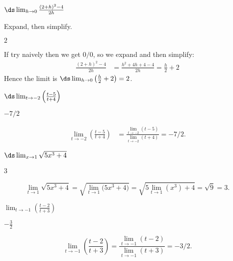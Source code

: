 \begin{Mquestion}[2015Q]
$\ds \lim_{h \to 0} \frac{(2+h)^2-4}{2h}$
\end{Mquestion}
\begin{hint}
Expand, then simplify.
\end{hint}
\begin{answer}
$2$
\end{answer}
\begin{solution}
If try naively then we get $0/0$, so we expand and then simplify:
\begin{align*}
  \frac{(2+h)^2-4}{2h} &= \frac{h^2+4h+4-4}{2h} = \frac{h}{2}+2
\end{align*}
Hence the limit is $\ds \lim_{h \to 0} \left(\frac{h}{2}+2\right) = 2$.
\end{solution}


\begin{question}[2015Q]
 $\ds \lim_{t\to -2} \left(\frac{t-5}{t+4}\right)$
\end{question}
\begin{answer}
$-7/2$
\end{answer}
\begin{solution}
 \begin{align*}
  \lim_{t\to -2} \left(\frac{t-5}{t+4}\right)
  &= \frac{\lim_{t\to -2} (t-5)}{\lim_{t\to-2}(t+4)}
  = -7/2.
\end{align*}
\end{solution}


\begin{question}[2015Q]
  $\ds \lim_{x\to 1} \sqrt{5x^3 + 4}$
\end{question}
\begin{answer}
3
\end{answer}
\begin{solution}
    \[
        \lim_{t\to 1} \sqrt{5x^3 + 4} =
        \sqrt{\lim_{t\to 1}\bigl(5x^3 + 4\bigr)} =
        \sqrt{5\lim_{t\to 1}(x^3) + 4} =
        \sqrt{9} =
        3.
    \]
\end{solution}



\begin{question}[2015Q]
$\displaystyle\lim_{t\rightarrow -1} \left(\frac{t-2}{t+3}\right)$
\end{question}
\begin{answer} $-\frac{3}{2}$
\end{answer}
\begin{solution}
\[  \lim_{t\rightarrow -1} \left(\frac{t-2}{t+3}\right)
  = \frac{\displaystyle\lim_{t\rightarrow -1} (t-2)}{\displaystyle\lim_{t\rightarrow-1}(t+3)}
  = -3/2.
\]\end{solution}



